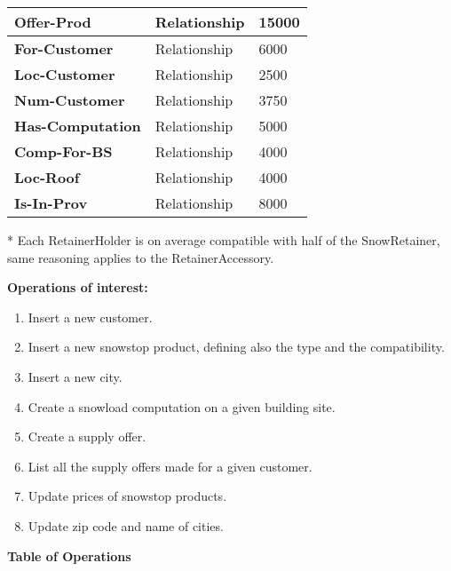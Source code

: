 {\begin{table}[H]
\begin{tabular}{ | m{4.5cm} | m{4.5cm}| m{4.5cm} |}
    \hline
    \color[HTML]{3531FF} \textbf{Offer-Prod} & Relationship & 15000\\
    \hline
    \color[HTML]{3531FF} \textbf{For-Customer} & Relationship & 6000\\
    \hline
    \color[HTML]{3531FF} \textbf{Loc-Customer} & Relationship & 2500\\
    \hline
    \color[HTML]{3531FF} \textbf{Num-Customer} & Relationship & 3750 \\
    \hline
    \color[HTML]{3531FF} \textbf{Has-Computation} & Relationship & 5000\\
    \hline
    \color[HTML]{3531FF} \textbf{Comp-For-BS} & Relationship & 4000\\
    \hline
    \color[HTML]{3531FF} \textbf{Loc-Roof} & Relationship & 4000\\
    \hline
    \color[HTML]{3531FF} \textbf{Is-In-Prov} & Relationship & 8000 \\
    \hline
  \end{tabular}
\end{table}
\small{* Each RetainerHolder is on average compatible with half of the SnowRetainer, same reasoning applies to the RetainerAccessory.}

\pagebreak

\textbf{Operations of interest:}

\begin{enumerate}
  \item Insert a new customer.
  \item Insert a new snowstop product, defining also the type and the compatibility.
  \item Insert a new city.
  \item Create a snowload computation on a given building site.
  \item Create a supply offer.
  \item List all the supply offers made for a given customer.
  \item Update prices of snowstop products.
  \item Update zip code and name of cities.
\end{enumerate}

\vspace{12px}

{\centering \textbf{Table of Operations}\\}

}
